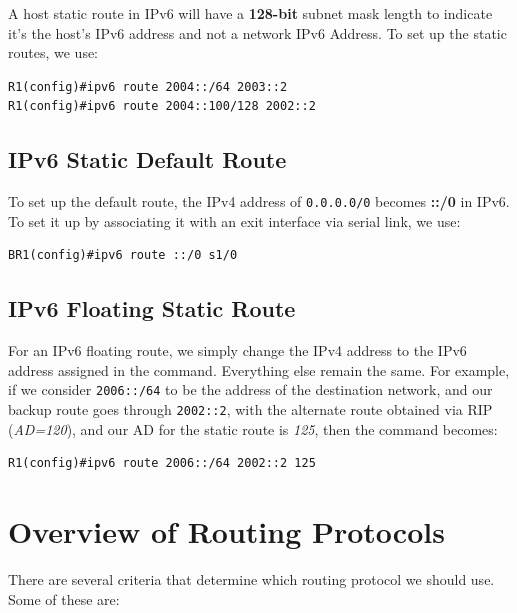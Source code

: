 \noindent
A host static route in IPv6 will have a \textbf{128-bit} subnet mask length to indicate it's the host's IPv6 address and not a network IPv6 Address. To set up the static routes, we use: 

\vspace{-15pt}
\begin{verbatim}
R1(config)#ipv6 route 2004::/64 2003::2
R1(config)#ipv6 route 2004::100/128 2002::2
\end{verbatim}
\vspace{-10pt}

\subsection{IPv6 Static Default Route}
To set up the default route, the IPv4 address of \verb|0.0.0.0/0| becomes \textbf{::/0} in IPv6. To set it up by associating it with an exit interface via serial link, we use:

\vspace{-15pt}
\begin{verbatim}
BR1(config)#ipv6 route ::/0 s1/0
\end{verbatim}
\vspace{-10pt}

\subsection{IPv6 Floating Static Route}
For an IPv6 floating route, we simply change the IPv4 address to the IPv6 address assigned in the command. Everything else remain the same. For example, if we consider \verb|2006::/64| to be the address of the destination network, and our backup route goes through \verb|2002::2|, with the alternate route obtained via RIP (\textit{AD=120}), and our AD for the static route is \textit{125}, then the command becomes:

\vspace{-15pt}
\begin{verbatim}
R1(config)#ipv6 route 2006::/64 2002::2 125
\end{verbatim}
\vspace{-10pt}

\section{Overview of Routing Protocols}
There are several criteria that determine which routing protocol we should use. Some of these are:

